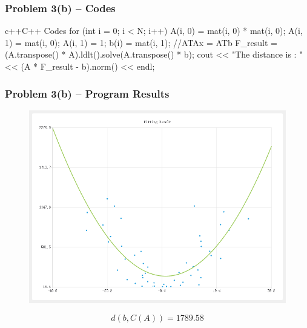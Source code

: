 \begin{frame}[fragile] 
    \frametitle{Problem 3(b) – Codes}
    \begin{codeblock}{c++}{C++ Codes}
        for (int i = 0; i < N; i++) 
        {
            A(i, 0) = mat(i, 0) * mat(i, 0);
            A(i, 1) = mat(i, 0);
            A(i, 1) = 1;
            b(i) = mat(i, 1);
        }
        //ATAx = ATb
        F_result = (A.transpose() * A).ldlt().solve(A.transpose() * b);
        cout << "The distance is : " << (A * F_result - b).norm() << endl;
    \end{codeblock}
\end{frame}

\begin{frame}         %
    \frametitle{Problem 3(b) – Program Results}

    \begin{figure}
        \centering
        \includegraphics[height = 0.5\textheight]{img/result3_2.png}
    \end{figure}
        \begin{equation}
        d(b,C(A))=1789.58
    \end{equation}
\end{frame}
